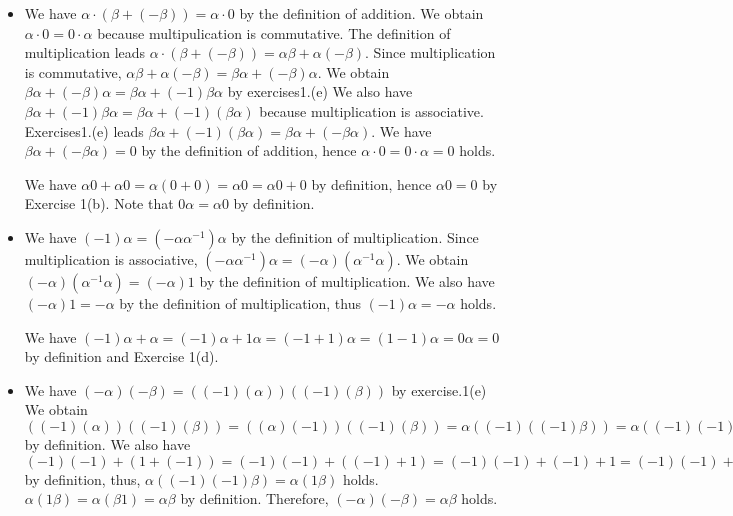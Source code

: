 \documentclass{article}
\begin{document}
\begin{itemize}
  \item[(d)]
    We have $\alpha\cdot(\beta + (-\beta)) = \alpha\cdot0$ by the definition of addition.
    We obtain $\alpha\cdot0 = 0\cdot\alpha$ because multipulication is commutative.
    The definition of multiplication leads $\alpha\cdot(\beta + (-\beta)) = \alpha\beta + \alpha(-\beta)$.
    Since multiplication is commutative, $\alpha\beta + \alpha(-\beta) = \beta\alpha + (-\beta)\alpha$.
    We obtain $\beta\alpha + (-\beta)\alpha = \beta\alpha + (-1)\beta\alpha$ by exercises1.(e)
    We also have $\beta\alpha + (-1)\beta\alpha = \beta\alpha + (-1)(\beta\alpha)$ because multiplication is associative.
    Exercises1.(e) leads $\beta\alpha + (-1)(\beta\alpha) = \beta\alpha + (-\beta\alpha)$.
    We have $\beta\alpha + (-\beta\alpha) = 0$ by the definition of addition,
    hence $\alpha\cdot0 = 0\cdot\alpha = 0$ holds.
    
    {\color{red}
      We have $\alpha 0 + \alpha 0 = \alpha (0 + 0) = \alpha 0 = \alpha 0 + 0$ by definition, hence $\alpha 0 = 0$ by Exercise 1(b).
      Note that $0 \alpha = \alpha 0$ by definition.
    }
    
  \item[(e)]We have $(-1)\alpha = (-\alpha\alpha^{-1})\alpha$ by the definition of multiplication.
    Since multiplication is associative, $(-\alpha\alpha^{-1})\alpha = (-\alpha)(\alpha^{-1}\alpha)$.
    We obtain $(-\alpha)(\alpha^{-1}\alpha) = (-\alpha)1$ by the definition of multiplication.
    We also have $(-\alpha)1 = -\alpha$ by the definition of multiplication, 
    thus $(-1)\alpha = -\alpha$ holds.
    
    {\color{red}
      We have $(-1)\alpha + \alpha = (-1)\alpha + 1\alpha = (-1 + 1)\alpha = (1 - 1)\alpha = 0\alpha = 0$ by definition and Exercise 1(d).
    }
    
  \item[(f)]We have $(-\alpha)(-\beta) = ((-1)(\alpha))((-1)(\beta))$ by exercise.1(e)
    We obtain $((-1)(\alpha))((-1)(\beta)) = ((\alpha)(-1))((-1)(\beta)) = \alpha((-1)((-1)\beta)) = \alpha((-1)(-1)\beta)$ by definition.
    We also have $(-1)(-1) + (1 + (-1)) = (-1)(-1) + ((-1) + 1) = (-1)(-1) + (-1) + 1 = (-1)(-1) + (-1)1 + 1 = (-1)(-1 + 1) + 1 = (-1)(1 + (-1)) + 1 = (-1)0 + 1 = 0 + 1 = 1 + 0 = 1$ by definition,
    thus, $\alpha((-1)(-1)\beta) = \alpha(1\beta)$ holds.
    $\alpha(1\beta) = \alpha(\beta1) = \alpha\beta$ by definition.
    Therefore, $(-\alpha)(-\beta) = \alpha\beta$ holds.
    

\end{itemize}
\end{document}
